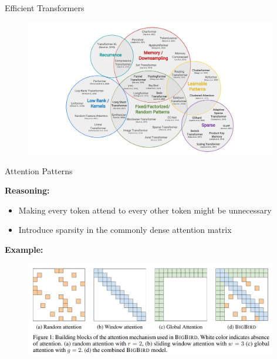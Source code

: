 \begin{frame}{Efficient Transformers}

\vfill

	\begin{figure}
		\centering
		\includegraphics[width = 11cm]{figure/tay-xformers.png}\\ 
	\end{figure}
	
\vfill

\end{frame}


\begin{frame}{Attention Patterns}

\vfill

\textbf{Reasoning:} 

\begin{itemize}
	\item Making every token attend to every other token might be unnecessary
	\item Introduce sparsity in the commonly dense attention matrix
\end{itemize}

\textbf{Example:}

	\begin{figure}
		\centering
		\includegraphics[width = 11cm]{figure/bigbird-patterns.png}\\ 
	\end{figure}
	
\vfill

\end{frame}

